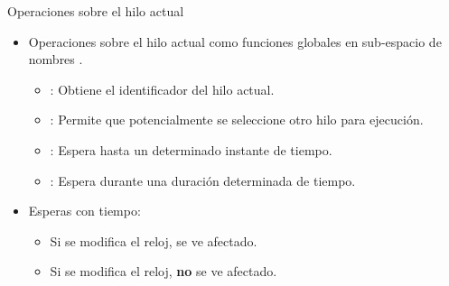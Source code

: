 \begin{frame}{Operaciones sobre el hilo actual}
\begin{itemize}
  \item Operaciones sobre el hilo actual como funciones globales en sub-espacio de nombres .
    \begin{itemize}
      \item {}: Obtiene el identificador del hilo actual.
      \item {}: Permite que potencialmente se seleccione otro hilo para ejecución.
      \item {}: Espera hasta un determinado instante de tiempo.
      \item {}: Espera durante una duración determinada de tiempo.
    \end{itemize}
  \item Esperas con tiempo:
    \begin{itemize}
      \item Si se modifica el reloj,  se ve afectado.
      \item Si se modifica el reloj,  \textbf{no} se ve afectado.
    \end{itemize}
\end{itemize}
\end{frame}

